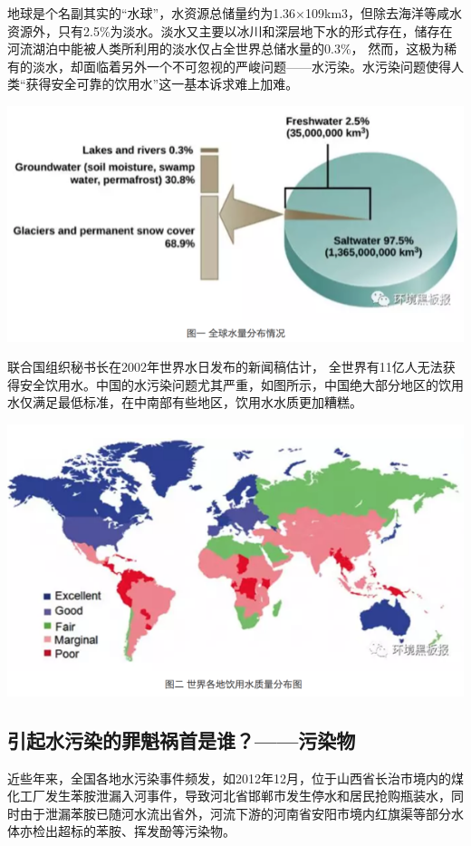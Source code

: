 \documentclass[]{book}
\begin{document}
地球是个名副其实的``水球''，水资源总储量约为1.36×109km3，但除去海洋等咸水资源外，只有2.5\%为淡水。淡水又主要以冰川和深层地下水的形式存在，储存在河流湖泊中能被人类所利用的淡水仅占全世界总储水量的0.3\%，
然而，这极为稀有的淡水，却面临着另外一个不可忽视的严峻问题------水污染。水污染问题使得人类``获得安全可靠的饮用水''这一基本诉求难上加难。

\includegraphics[width=8.33in]{images/dushui1}

联合国组织秘书长在2002年世界水日发布的新闻稿估计，
全世界有11亿人无法获得安全饮用水。中国的水污染问题尤其严重，如图所示，中国绝大部分地区的饮用水仅满足最低标准，在中南部有些地区，饮用水水质更加糟糕。

\includegraphics[width=8.33in]{images/dushui2}

\subsection{引起水污染的罪魁祸首是谁？------污染物}

近些年来，全国各地水污染事件频发，如2012年12月，位于山西省长治市境内的煤化工厂发生苯胺泄漏入河事件，导致河北省邯郸市发生停水和居民抢购瓶装水，同时由于泄漏苯胺已随河水流出省外，河流下游的河南省安阳市境内红旗渠等部分水体亦检出超标的苯胺、挥发酚等污染物。
\end{document}
